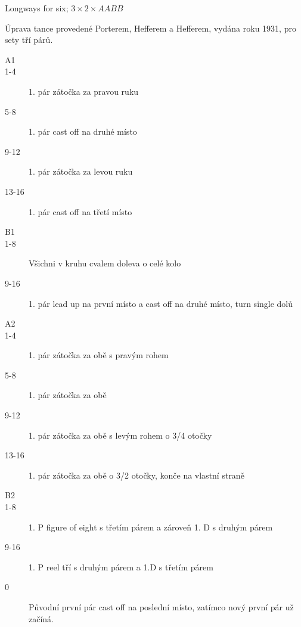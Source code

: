 %

{\large Longways for six; $3 \times 2 \times AABB$\hfill {}}

\HRule
\HRule
\vspace{1em}
Úprava tance provedené Porterem, Hefferem a Hefferem, vydána roku 1931, pro sety tří párů.
\begin{description}
    \item[A1]
    \item[1-4]1. pár zátočka za pravou ruku
    \item[5-8]1. pár cast off na druhé místo
    \item[9-12]1. pár zátočka za levou ruku
    \item[13-16]1. pár cast off na třetí místo
    \item[B1]
    \item[1-8] Všichni v kruhu cvalem doleva o celé kolo
    \item[9-16] 1. pár lead up na první místo a cast off na druhé místo, turn single dolů
    \item[A2]
    \item[1-4]1. pár zátočka za obě s pravým rohem
    \item[5-8]1. pár zátočka za obě
    \item[9-12]1. pár zátočka za obě s levým rohem o 3/4 otočky
    \item[13-16]1. pár zátočka za obě o 3/2 otočky, konče na vlastní straně
    \item[B2]
    \item[1-8]1. P figure of eight s třetím párem a zároveň 1. D s druhým párem
    \item[9-16]1. P reel tří s druhým párem a 1.D s třetím párem
    \item[0]Původní první pár cast off na poslední místo, zatímco nový první pár už začíná.
\end{description}